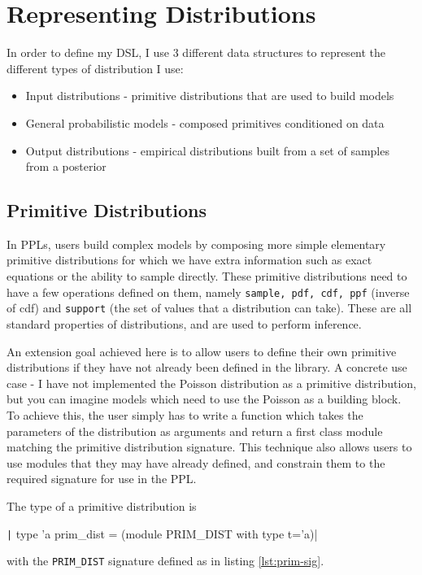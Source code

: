 \section{Representing Distributions}
In order to define my DSL, I use 3 different data structures to represent the different types of distribution I use:
\begin{itemize}
	\item Input distributions - primitive distributions that are used to build models
	\item General probabilistic models - composed primitives conditioned on data
	\item Output distributions - empirical distributions built from a set of samples from a posterior
\end{itemize}
\vspace{2mm}
\subsection{Primitive Distributions}
In PPLs, users build complex models by composing more simple elementary primitive distributions for which we have extra information such as exact equations or the ability to sample directly. These primitive distributions need to have a few operations defined on them, namely \texttt{sample, pdf, cdf, ppf} (inverse of cdf) and \texttt{support} (the set of values that a distribution can take). These are all standard properties of distributions, and are used to perform inference.

An extension goal achieved here is to allow users to define their own primitive distributions if they have not already been defined in the library. A concrete use case - I have not implemented the Poisson distribution as a primitive distribution, but you can imagine models which need to use the Poisson as a building block. To achieve this, the user simply has to write a function which takes the parameters of the distribution as arguments and return a first class module matching the primitive distribution signature. This technique also allows users to use modules that they may have already defined, and constrain them to the required signature for use in the PPL.
	
The type of a primitive distribution is 
\begin{center}
																												
	\texttt| type 'a prim_dist = (module PRIM_DIST with type t='a)|
\end{center}
with the \texttt{PRIM\_DIST} signature defined as in listing \ref{lst:prim-sig}.

